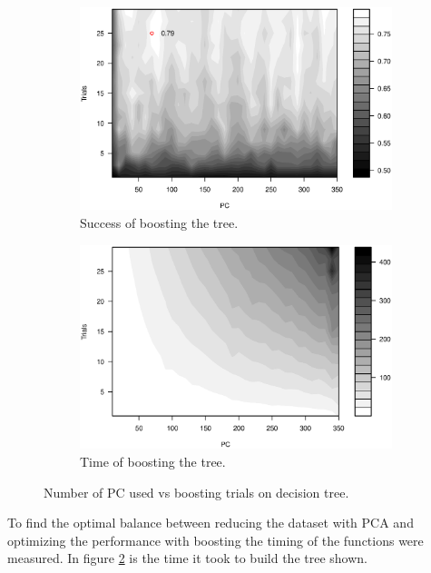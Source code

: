 \begin{figure}[H]
\centering
    \begin{subfigure}[t]{0.49\textwidth}
        \includegraphics[width=\textwidth]{graphics/tree_pca_vs_boost_success}
        \caption{Success of boosting the tree.}
        \label{fig:tree_pca_boost}
    \end{subfigure}
    \begin{subfigure}[t]{0.49\textwidth}
        \includegraphics[width=\textwidth]{graphics/tree_pca_vs_boost_time}
        \caption{Time of boosting the tree.}
        \label{fig:tree_pca_boost_timing}
    \end{subfigure}
\caption{Number of PC used vs boosting trials on decision tree.}
\label{fig:tree_pca_boost}
\end{figure}

To find the optimal balance between reducing the dataset with PCA and optimizing the performance with boosting the timing of the functions were measured.
In figure \ref{fig:tree_pca_boost_timing} is the time it took to build the tree shown.

